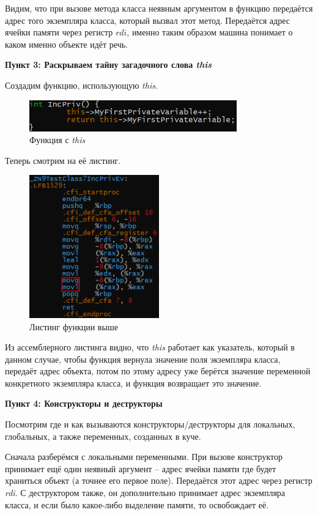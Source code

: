 \documentclass[a4paper,12pt]{article}
\begin{document}
Видим, что при вызове метода класса неявным аргументом в функцию передаётся адрес того экземпляра класса, который вызвал этот метод. Передаётся адрес ячейки памяти через регистр $rdi$, именно таким образом машина понимает о каком именно объекте идёт речь.

\newpage
\textbf{Пункт 3: Раскрываем тайну загадочного слова \textit{this}}

Создадим функцию, использующую \textit{this}.
\begin{figure}[H]\label{fig: This код}
    \centering
    \includegraphics[width = 0.8\textwidth]{This функция код.png}
    \caption{Функция с \textit{this}}
\end{figure}
Теперь смотрим на её листинг.
\begin{figure}[H]\label{fig: This листинг}
    \centering
    \includegraphics[width = 0.5\textwidth]{This функция листинг.png}
    \caption{Листинг функции выше}
\end{figure}
Из ассемблерного листинга видно, что \textit{this} работает как указатель, который в данном случае, чтобы функция вернула значение поля экземпляра класса, передаёт адрес объекта, потом по этому адресу уже берётся значение переменной конкретного экземпляра класса, и функция возвращает это значение.  

\textbf{Пункт 4: Конструкторы и деструкторы}

Посмотрим где и как вызываются конструкторы/деструкторы для локальных, глобальных, а также переменных, созданных в куче.

Сначала разберёмся с локальными переменными. При вызове конструктор принимает ещё один неявный аргумент -- адрес ячейки памяти где будет храниться объект (а точнее его первое поле). Передаётся этот адрес через регистр \textit{rdi}. С деструктором также, он дополнительно принимает адрес экземпляра класса, и если было какое-либо выделение памяти, то освобождает её.  
\end{document}
